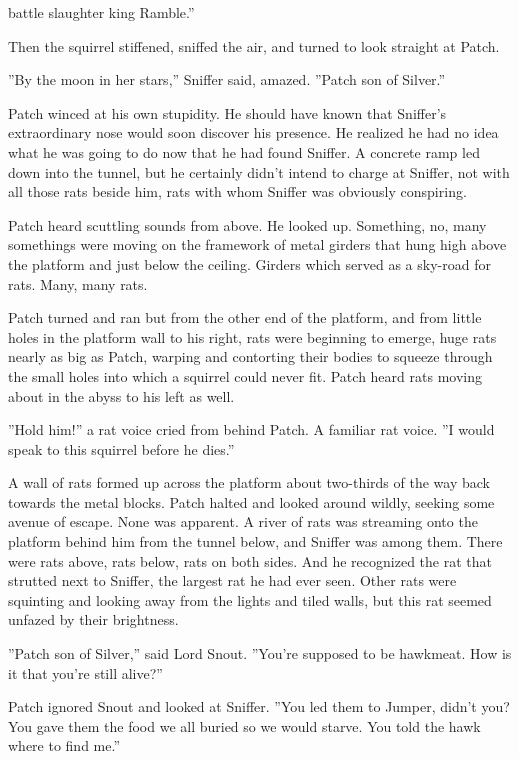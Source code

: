 \documentclass[12pt]{book}
\begin{document}
battle%
slaughter%
king%
Ramble.''\par
 Then the squirrel stiffened, sniffed the air, and turned to look straight at Patch.\par
 ''By the moon in her stars,'' Sniffer said, amazed. ''Patch son of Silver.''\par
 Patch winced at his own stupidity. He should have known that Sniffer's extraordinary nose would soon discover his presence. He realized he had no idea what he was going to do now that he had found Sniffer. A concrete ramp led down into the tunnel, but he certainly didn't intend to charge at Sniffer, not with all those rats beside him, rats with whom Sniffer was obviously conspiring.\par
Patch heard scuttling sounds from above. He looked up. Something, no, many somethings were moving on the framework of metal girders that hung high above the platform and just below the ceiling. Girders which served as a sky-road for rats. Many, many rats.\par
 Patch turned and ran %
 but from the other end of the platform, and from little holes in the platform wall to his right, rats were beginning to emerge, huge rats nearly as big as Patch, warping and contorting their bodies to squeeze through the small holes into which a squirrel could never fit. Patch heard rats moving about in the abyss to his left as well.\par
 ''Hold him!'' a rat voice cried from behind Patch. A familiar rat voice. ''I would speak to this squirrel before he dies.''\par
 A wall of rats formed up across the platform about two-thirds of the way back towards the metal blocks. Patch halted and looked around wildly, seeking some avenue of escape. None was apparent. A river of rats was streaming onto the platform behind him from the tunnel below, and Sniffer was among them. There were rats above, rats below, rats on both sides. And he recognized the rat that strutted next to Sniffer, the largest rat he had ever seen. Other rats were squinting and looking away from the lights and tiled walls, but this rat seemed unfazed by their brightness.\par
 ''Patch son of Silver,'' said Lord Snout. ''You're supposed to be hawkmeat. How is it that you're still alive?''\par
 Patch ignored Snout and looked at Sniffer. ''You led them to Jumper, didn't you? You gave them the food we all buried so we would starve. You told the hawk where to find me.''\par
\end{document}
